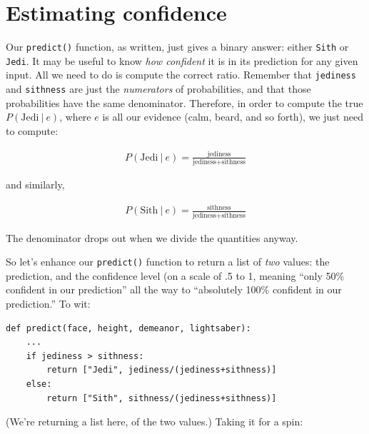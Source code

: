 \section{Estimating confidence}


Our \texttt{predict()} function, as written, just gives a binary answer: either
\texttt{Sith} or \texttt{Jedi}. It may be useful to know \textit{how confident}
it is in its prediction for any given input. All we need to do is compute the
correct ratio. Remember that \texttt{jediness} and \texttt{sithness} are just
the \textit{numerators} of probabilities, and that those probabilities have the
same denominator. Therefore, in order to compute the true $P(\textrm{Jedi}\ |\
e)$, where $e$ is all our evidence (calm, beard, and so forth), we just need to
compute:

\vspace{-.2in}
\begin{align*}
P(\textrm{Jedi}\ |\ e) = \frac{\textrm{jediness}}{\textrm{jediness} + \textrm{sithness}}
\end{align*}
\vspace{-.2in}

and similarly, 

\vspace{-.2in}
\begin{align*}
P(\textrm{Sith}\ |\ e) = \frac{\textrm{sithness}}{\textrm{jediness} + \textrm{sithness}}
\end{align*}
\vspace{-.2in}

The denominator drops out when we divide the quantities anyway.

\medskip

So let's enhance our \texttt{predict()} function to return a list of
\textit{two} values: the prediction, and the confidence level (on a scale of
.5 to 1, meaning ``only 50\% confident in our prediction'' all the way to
``absolutely 100\% confident in our prediction.'' To wit:

\begin{Verbatim}[fontsize=\small,samepage=true,frame=single,framesep=3mm]
def predict(face, height, demeanor, lightsaber):
    ...
    if jediness > sithness:
        return ["Jedi", jediness/(jediness+sithness)]
    else:
        return ["Sith", sithness/(jediness+sithness)]
\end{Verbatim}


(We're returning a list here, of the two values.) Taking it for a spin:

